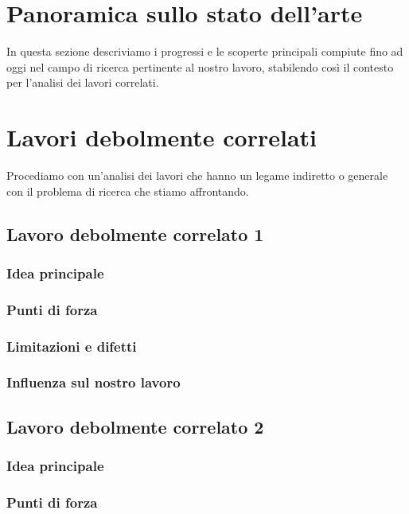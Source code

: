 \section{Panoramica sullo stato dell'arte}

In questa sezione descriviamo i progressi e le scoperte principali compiute fino ad oggi nel campo di ricerca pertinente al nostro lavoro, stabilendo così il contesto per l'analisi dei lavori correlati.

\section{Lavori debolmente correlati}

Procediamo con un'analisi dei lavori che hanno un legame indiretto o generale con il problema di ricerca che stiamo affrontando.

\subsection{Lavoro debolmente correlato 1}
\subsubsection{Idea principale}
\subsubsection{Punti di forza}
\subsubsection{Limitazioni e difetti}
\subsubsection{Influenza sul nostro lavoro}

\subsection{Lavoro debolmente correlato 2}
\subsubsection{Idea principale}
\subsubsection{Punti di forza}
